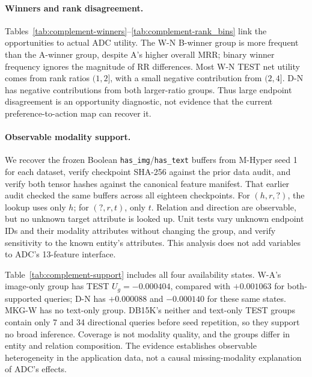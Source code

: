 \documentclass[11pt,a4paper]{article}
\begin{document}
\paragraph{Winners and rank disagreement.}
Tables~\ref{tab:complement-winners}--\ref{tab:complement-rank_bins} link the opportunities to actual ADC utility. The W-N B-winner group is more frequent than the A-winner group, despite A's higher overall MRR; binary winner frequency ignores the magnitude of RR differences. Most W-N TEST net utility comes from rank ratios $(1,2]$, with a small negative contribution from $(2,4]$. D-N has negative contributions from both larger-ratio groups. Thus large endpoint disagreement is an opportunity diagnostic, not evidence that the current preference-to-action map can recover it.



\paragraph{Observable modality support.}
We recover the frozen Boolean \texttt{has\_img}/\texttt{has\_text} buffers from M-Hyper seed 1 for each dataset, verify checkpoint SHA-256 against the prior data audit, and verify both tensor hashes against the canonical feature manifest. That earlier audit checked the same buffers across all eighteen checkpoints. For $(h,r,?)$, the lookup uses only $h$; for $(?,r,t)$, only $t$. Relation and direction are observable, but no unknown target attribute is looked up. Unit tests vary unknown endpoint IDs and their modality attributes without changing the group, and verify sensitivity to the known entity's attributes. This analysis does not add variables to ADC's 13-feature interface.

Table~\ref{tab:complement-support} includes all four availability states. W-A's image-only group has TEST $U_g=-0.000404$, compared with $+0.001063$ for both-supported queries; D-N has $+0.000088$ and $-0.000140$ for these same states. MKG-W has no text-only group. DB15K's neither and text-only TEST groups contain only 7 and 34 directional queries before seed repetition, so they support no broad inference. Coverage is not modality quality, and the groups differ in entity and relation composition. The evidence establishes observable heterogeneity in the application data, not a causal missing-modality explanation of ADC's effects.

\end{document}
